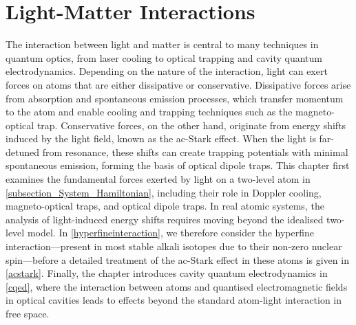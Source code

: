 \documentclass[../Thesis-IJspeert.tex]{subfiles}
\begin{document}
\graphicspath{ {"Light Matter Interactions/figs/"} }

\chapter{Light-Matter Interactions}
\label{chap:LightMatterInteractions}

The interaction between light and matter is central to many techniques in quantum optics, from laser cooling to optical trapping and cavity quantum electrodynamics. Depending on the nature of the interaction, light can exert forces on atoms that are either dissipative or conservative. Dissipative forces arise from absorption and spontaneous emission processes, which transfer momentum to the atom and enable cooling and trapping techniques such as the magneto-optical trap. Conservative forces, on the other hand, originate from energy shifts induced by the light field, known as the ac-Stark effect. When the light is far-detuned from resonance, these shifts can create trapping potentials with minimal spontaneous emission, forming the basis of optical dipole traps. This chapter first examines the fundamental forces exerted by light on a two-level atom in \autoref{subsection_System_Hamiltonian}, including their role in Doppler cooling, magneto-optical traps, and optical dipole traps. In real atomic systems, the analysis of light-induced energy shifts requires moving beyond the idealised two-level model. In \autoref{hyperfineinteraction}, we therefore consider the hyperfine interaction---present in most stable alkali isotopes due to their non-zero nuclear spin---before a detailed treatment of the ac-Stark effect in these atoms is given in \autoref{acstark}. Finally, the chapter introduces cavity quantum electrodynamics in \autoref{cqed}, where the interaction between atoms and quantised electromagnetic fields in optical cavities leads to effects beyond the standard atom-light interaction in free space.
\end{document}
